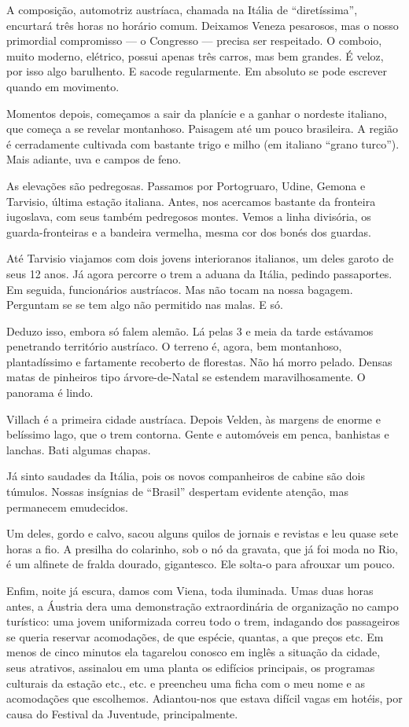 A composição, automotriz austríaca, chamada na Itália de ``diretíssima'', encurtará três horas no horário comum. Deixamos Veneza pesarosos, mas o nosso primordial compromisso --- o Congresso --- precisa ser respeitado. O comboio, muito moderno, elétrico, possui apenas três carros, mas bem grandes. É veloz, por isso algo barulhento. E sacode regularmente. Em absoluto se pode escrever quando em movimento.

Momentos depois, começamos a sair da planície e a ganhar o nordeste italiano, que começa a se revelar montanhoso. Paisagem até um pouco brasileira. A região é cerradamente cultivada com bastante trigo e milho (em italiano ``grano turco''). Mais adiante, uva e campos de feno.

As elevações são pedregosas. Passamos por Portogruaro, Udine, Gemona e Tarvisio, última estação italiana. Antes, nos acercamos bastante da fronteira iugoslava, com seus também pedregosos montes. Vemos a linha divisória, os guarda-fronteiras e a bandeira vermelha, mesma cor dos bonés dos guardas.

Até Tarvisio viajamos com dois jovens interioranos italianos, um deles garoto de seus 12 anos. Já agora percorre o trem a aduana da Itália, pedindo passaportes. Em seguida, funcionários austríacos. Mas não tocam na nossa bagagem. Perguntam se se tem algo não permitido nas malas. E só.

Deduzo isso, embora só falem alemão. Lá pelas 3 e meia da tarde estávamos penetrando território austríaco. O terreno é, agora, bem montanhoso, plantadíssimo e fartamente recoberto de florestas. Não há morro pelado. Densas matas de pinheiros tipo árvore-de-Natal se estendem maravilhosamente. O panorama é lindo.

Villach é a primeira cidade austríaca. Depois Velden, às margens de enorme e belíssimo lago, que o trem contorna. Gente e automóveis em penca, banhistas e lanchas. Bati algumas chapas.

Já sinto saudades da Itália, pois os novos companheiros de cabine são dois túmulos. Nossas insígnias de ``Brasil'' despertam evidente atenção, mas permanecem emudecidos.

Um deles, gordo e calvo, sacou alguns quilos de jornais e revistas e leu quase sete horas a fio. A presilha do colarinho, sob o nó da gravata, que já foi moda no Rio, é um alfinete de fralda dourado, gigantesco. Ele solta-o para afrouxar um pouco.

Enfim, noite já escura, damos com Viena, toda iluminada. Umas duas horas antes, a Áustria dera uma demonstração extraordinária de organização no campo turístico: uma jovem uniformizada correu todo o trem, indagando dos passageiros se queria reservar acomodações, de que espécie, quantas, a que preços etc. Em menos de cinco minutos ela tagarelou conosco em inglês a situação da cidade, seus atrativos, assinalou em uma planta os edifícios principais, os programas culturais da estação etc., etc. e preencheu uma ficha com o meu nome e as acomodações que escolhemos. Adiantou-nos que estava difícil vagas em hotéis, por causa do Festival da Juventude, principalmente.

